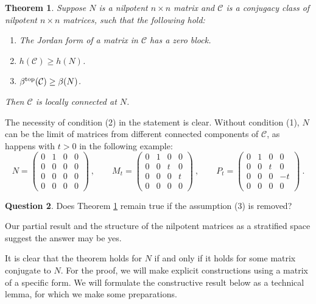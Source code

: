 \documentclass{amsart}
\newtheorem{theorem}{Theorem}[section]
\theoremstyle{definition}
\newtheorem{question}[theorem]{Question}
\theoremstyle{remark}
\numberwithin{equation}{section}
\begin{document}
{{\begin{theorem} \label{matrixconnection}
Suppose $N$ is a nilpotent $n\times n$ matrix and  $\mathcal C$ is a conjugacy class of nilpotent 
$n\times n$ matrices, such that the following hold: 
\begin{enumerate} 
\item The Jordan form of a matrix in $\mathcal C$ has a 
zero block.  
\item  $h(\mathcal C)\geq h(N)$. 
\item 
$\beta^{\textnormal{top}}(\mathcal C)\geq \beta(N)$. 
\end{enumerate} 
Then $\mathcal C$ is locally connected at $N$. 
\end{theorem} 

The necessity of condition (2) in the statement is clear. 
Without condition (1), $N$ can be the limit of matrices from 
different connected components of $\mathcal C$, as happens 
with $t> 0$ in the following example: 
\[
N= 
\begin{pmatrix} 
0 & 1 & 0 & 0 \\ 0 & 0 & 0 & 0 \\ 0 & 0 & 0 & 0 \\ 0 & 0 & 0 & 0 
\end{pmatrix} \ , \qquad 
M_t=
\begin{pmatrix} 
0 & 1 & 0 & 0 \\ 0 & 0 & t & 0 \\ 0 & 0 & 0 & t \\ 0 & 0 & 0 & 0 
\end{pmatrix} \ , \qquad 
P_t=
\begin{pmatrix} 
0 & 1 & 0 & 0 \\ 0 & 0 & t & 0 \\ 0 & 0 &  0& -t \\ 0 & 0 & 0 & 0 
\end{pmatrix} \ .  
\] 

\begin{question} 
Does Theorem \ref{matrixconnection} remain true if the assumption 
(3) is removed? 
\end{question} 

Our partial result and the structure of the nilpotent matrices as 
a stratified space \cite{Ve1,Ve2,Wh} suggest the answer may be yes. 

It is clear that the theorem holds for $N$ if and only if 
it holds for some matrix conjugate to $N$. For the proof, 
we will make explicit constructions using a matrix of a 
specific form. We will formulate the constructive result 
 below as a technical lemma, for which we make some 
preparations.  

}}
\end{document}
